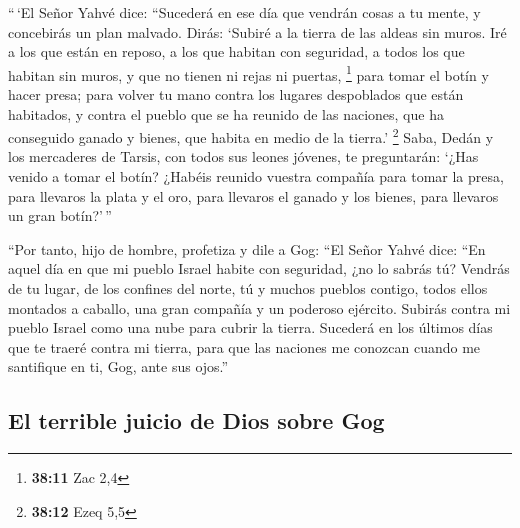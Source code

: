 \begin{paracol}{2}
 ``\,`El Señor Yahvé dice: ``Sucederá en ese día que
vendrán cosas a tu mente, y concebirás un plan malvado. 
Dirás: `Subiré a la tierra de las aldeas sin muros. Iré a los que están
en reposo, a los que habitan con seguridad, a todos los que habitan sin
muros, y que no tienen ni rejas ni puertas, \footnote{\textbf{38:11} Zac
  2,4}  para tomar el botín y hacer presa; para volver tu
mano contra los lugares despoblados que están habitados, y contra el
pueblo que se ha reunido de las naciones, que ha conseguido ganado y
bienes, que habita en medio de la tierra.' \footnote{\textbf{38:12} Ezeq
  5,5}  Saba, Dedán y los mercaderes de Tarsis, con todos
sus leones jóvenes, te preguntarán: `¿Has venido a tomar el botín?
¿Habéis reunido vuestra compañía para tomar la presa, para llevaros la
plata y el oro, para llevaros el ganado y los bienes, para llevaros un
gran botín?'\,''

 ``Por tanto, hijo de hombre, profetiza y dile a Gog:
``El Señor Yahvé dice: ``En aquel día en que mi pueblo Israel habite con
seguridad, ¿no lo sabrás tú?  Vendrás de tu lugar, de los
confines del norte, tú y muchos pueblos contigo, todos ellos montados a
caballo, una gran compañía y un poderoso ejército. 
Subirás contra mi pueblo Israel como una nube para cubrir la tierra.
Sucederá en los últimos días que te traeré contra mi tierra, para que
las naciones me conozcan cuando me santifique en ti, Gog, ante sus
ojos.''

\hypertarget{el-terrible-juicio-de-dios-sobre-gog}{%
\subsection{El terrible juicio de Dios sobre
Gog}\label{el-terrible-juicio-de-dios-sobre-gog}}


\end{paracol}
